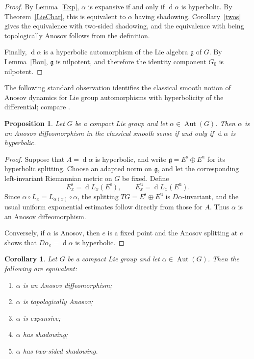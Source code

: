 \documentclass[12pt]{amsart}
\newtheorem{corollary}[theorem]{Corollary}
\newtheorem{proposition}[theorem]{Proposition}
\theoremstyle{definition}
\numberwithin{equation}{section}
\theoremstyle{remark}
\DeclareMathOperator{\di}{d}
\begin{document}
\begin{proof}
By Lemma~\ref{Exp}, $\alpha$ is expansive if and only if $\di\alpha$ is
hyperbolic. By Theorem~\ref{LieChar}, this is equivalent to $\alpha$ having
shadowing. Corollary~\ref{twos} gives the equivalence with two-sided
shadowing, and the equivalence with being topologically Anosov follows from
the definition.

Finally, $\di\alpha$ is a hyperbolic automorphism of the Lie algebra
$\mathfrak g$ of $G$. By Lemma~\ref{Bou}, $\mathfrak g$ is nilpotent, and
therefore the identity component $G_0$ is nilpotent.
\end{proof}

The following standard observation identifies the classical smooth
notion of Anosov dynamics for Lie group automorphisms with hyperbolicity
of the differential; compare \cite{Morimoto1981,Bhattacharya2004,Shah2020}.

\begin{proposition}\label{prop:classical-Anosov-Lie}
Let $G$ be a compact Lie group and let
$\alpha\in\operatorname{Aut}(G)$. Then $\alpha$ is an Anosov
diffeomorphism in the classical smooth sense if and only if
$\di\alpha$ is hyperbolic.
\end{proposition}

\begin{proof}
Suppose that $A=\di\alpha$ is hyperbolic, and write
$\mathfrak g=E^{\mathrm s}\oplus E^{\mathrm u}$ for its hyperbolic
splitting. Choose an adapted norm on $\mathfrak g$, and let the
corresponding left-invariant Riemannian metric on $G$ be fixed. Define
\[
E_x^{\mathrm s}=\di L_x(E^{\mathrm s}),
\qquad
E_x^{\mathrm u}=\di L_x(E^{\mathrm u}).
\]
Since $\alpha\circ L_x=L_{\alpha(x)}\circ\alpha$, the splitting
$TG=E^{\mathrm s}\oplus E^{\mathrm u}$ is $D\alpha$-invariant, and the
usual uniform exponential estimates follow directly from those for $A$.
Thus $\alpha$ is an Anosov diffeomorphism.

Conversely, if $\alpha$ is Anosov, then $e$ is a fixed point and the
Anosov splitting at $e$ shows that $D\alpha_e=\di\alpha$ is hyperbolic.
\end{proof}

\begin{corollary}\label{cor:compact-Lie-Anosov}
Let $G$ be a compact Lie group and let
$\alpha\in\operatorname{Aut}(G)$. Then the following are equivalent:
\begin{enumerate}
\item $\alpha$ is an Anosov diffeomorphism;
\item $\alpha$ is topologically Anosov;
\item $\alpha$ is expansive;
\item $\alpha$ has shadowing;
\item $\alpha$ has two-sided shadowing.
\end{enumerate}
\end{corollary}
\end{document}
